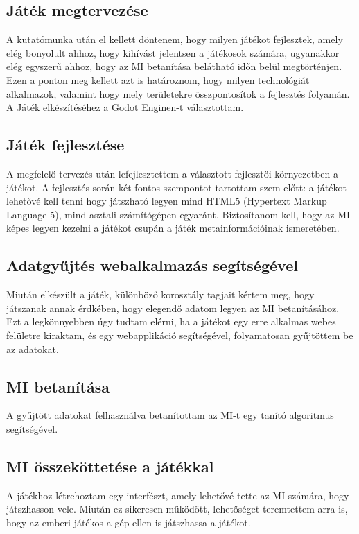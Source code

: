 \subsection{Játék megtervezése}
A kutatómunka után el kellett döntenem, hogy milyen játékot fejlesztek, amely elég bonyolult ahhoz, hogy kihívást jelentsen a játékosok számára, ugyanakkor elég egyszerű ahhoz, hogy az MI betanítása belátható időn belül megtörténjen. Ezen a ponton meg kellett azt is határoznom, hogy milyen technológiát alkalmazok, valamint hogy mely területekre összpontosítok a fejlesztés folyamán. A Játék elkészítéséhez a Godot Enginen-t választottam.

\subsection{Játék fejlesztése}
A megfelelő tervezés után lefejlesztettem a választott fejlesztői környezetben a játékot. A fejlesztés során két fontos szempontot tartottam szem előtt: a játékot lehetővé kell tenni hogy játszható legyen mind HTML5 (Hypertext Markup Language 5), mind asztali számítógépen egyaránt. Biztosítanom kell, hogy az MI képes legyen kezelni a játékot csupán a játék metainformációinak ismeretében.

\subsection{Adatgyűjtés webalkalmazás segítségével}
Miután elkészült a játék, különböző korosztály tagjait kértem meg, hogy játszanak annak érdkében, hogy elegendő adatom legyen az MI betanításához. Ezt a legkönnyebben úgy tudtam elérni, ha a játékot egy erre alkalmas webes felületre kiraktam, és egy webapplikáció segítségével, folyamatosan gyűjtöttem be az adatokat. 

\subsection{MI betanítása}
A gyűjtött adatokat felhasználva betanítottam az MI-t egy tanító algoritmus segítségével.

\subsection{MI összeköttetése a játékkal}
A játékhoz létrehoztam egy interfészt, amely lehetővé tette az MI számára, hogy játszhasson vele. Miután ez sikeresen működött, lehetőséget teremtettem arra is, hogy az emberi játékos a gép ellen is játszhassa a játékot.